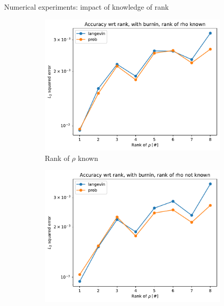 \documentclass{beamer}
\begin{document}
\begin{frame}{Numerical experiments: impact of knowledge of rank}
    \begin{figure}[H]

        \centering
    
        \begin{subfigure}[b]{0.49\textwidth}
    
    
            \centering
    
            \includegraphics[width=\textwidth]{figures/experiments/rank_info/rank_known-1.png}
    
            \caption{Rank of $\rho$ known}
    
            \label{fig:rank-info-sub}
    
        \end{subfigure}
        \hfill
        \begin{subfigure}[b]{0.49\textwidth}
    
    
            \centering
    
            \includegraphics[width=\textwidth]{figures/experiments/rank_info/rank_not_known-1.png}
    

\end{subfigure}
\end{figure}
\end{frame}
\end{document}
